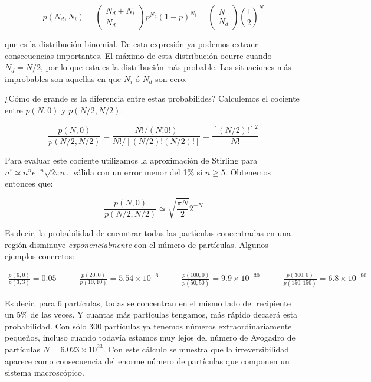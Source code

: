\documentclass[11pt, a4paper]{article} %
\theoremstyle{named}
\begin{document}
\begin{equation}\label{eq:gasBinom}
p\left(N_{d}, N_{i}\right)=\left(\begin{array}{c}
{N_{d}+N_{i}} \\
{N_{d}}
\end{array}\right) p^{N_{d}}(1-p)^{N_{i}}=\left(\begin{array}{c}
{N} \\
{N_{d}}
\end{array}\right)\left(\frac{1}{2}\right)^{N}
\end{equation}

que es la distribución binomial. De esta expresión ya podemos extraer consecuencias importantes. El máximo de esta distribución ocurre cuando $N_d = N/2$, por lo que esta es la distribución más probable. Las situaciones más improbables son aquellas en que $N_i$ ó $N_d$ son cero.

¿Cómo de grande es la diferencia entre estas probabilides? Calculemos el cociente entre $p(N, 0)$ y $p(N / 2, N / 2)$:

\begin{equation}
\frac{p(N, 0)}{p(N / 2, N / 2)}=\frac{N ! /(N ! 0 !)}{N ! /[(N / 2) !(N / 2) !]}=\frac{[(N / 2) !]^{2}}{N !}
\end{equation}

Para evaluar este cociente utilizamos la aproximación de Stirling para $n ! \simeq n^{n} e^{-n} \sqrt{2 \pi n},$ válida con un error menor del 1\% si $n \geq 5$. Obtenemos entonces que:

\begin{equation}
\frac{p(N, 0)}{p(N / 2, N / 2)} \simeq \sqrt{\frac{\pi N}{2}} 2^{-N}
\end{equation}

Es decir, la probabilidad de encontrar todas las partículas concentradas en una región disminuye \textit{exponencialmente} con el número de partículas. Algunos ejemplos concretos:

$$
\begin{array}{llll}
\frac{p(6,0)}{p(3,3)} = 0.05 \qquad &
\frac{p(20,0)}{p(10,10)} = 5.54\times10^{-6} \qquad &
\frac{p(100,0)}{p(50,50)} = 9.9\times10^{-30} \qquad &
\frac{p(300,0)}{p(150,150)} = 6.8\times10^{-90}
\end{array}
$$

Es decir, para $6$ partículas, todas se concentran en el mismo lado del recipiente un $5\%$ de las veces. Y cuantas más partículas tengamos, más rápido decaerá esta probabilidad. Con sólo $300$ partículas ya tenemos números extraordinariamente pequeños, incluso cuando todavía estamos muy lejos del número de Avogadro de partículas $N=6.023 \times 10^{23}$. Con este cálculo se muestra que la irreversibilidad aparece como consecuencia del enorme número de partículas que componen un sistema macroscópico.
\end{document}
